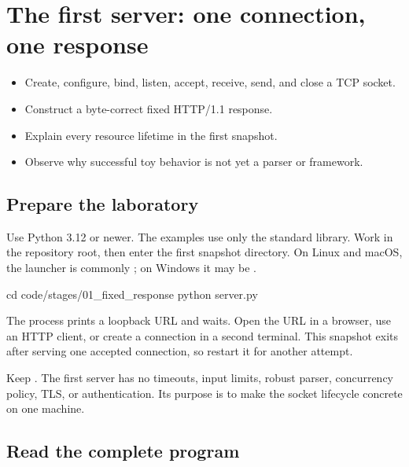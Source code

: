 \chapter{The first server: one connection, one response}

\begin{objectives}
\begin{itemize}
  \item Create, configure, bind, listen, accept, receive, send, and close a TCP socket.
  \item Construct a byte-correct fixed HTTP/1.1 response.
  \item Explain every resource lifetime in the first snapshot.
  \item Observe why successful toy behavior is not yet a parser or framework.
\end{itemize}
\end{objectives}

\section{Prepare the laboratory}

Use Python 3.12 or newer. The examples use only the standard library. Work in
the repository root, then enter the first snapshot directory. On Linux and
macOS, the launcher is commonly ; on Windows it may be .

\begin{wiremessage}
cd code/stages/01_fixed_response
python server.py
\end{wiremessage}

The process prints a loopback URL and waits. Open the URL in a browser, use an
HTTP client, or create a connection in a second terminal. This snapshot exits
after serving one accepted connection, so restart it for another attempt.

\begin{securityboundary}
Keep . The first server has no timeouts, input limits,
robust parser, concurrency policy, TLS, or authentication. Its purpose is to
make the socket lifecycle concrete on one machine.
\end{securityboundary}

\section{Read the complete program}

